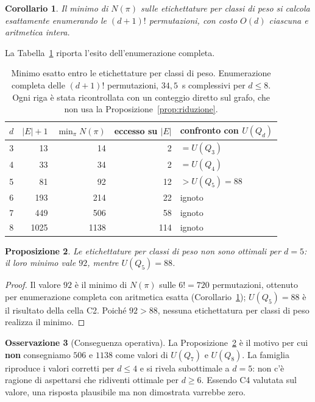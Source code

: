 \documentclass[11pt,a4paper]{article}
\theoremstyle{plain}
\newtheorem{proposition}{Proposizione}
\newtheorem{corollary}[proposition]{Corollario}
\theoremstyle{definition}
\newtheorem{remark}[proposition]{Osservazione}
\newcommand{\Qd}{Q_d}
\begin{document}
\begin{corollary}\label{cor:enumerazione}
Il minimo di $N(\pi)$ sulle etichettature per classi di peso si calcola
esattamente enumerando le $(d+1)!$ permutazioni, con costo $O(d)$ ciascuna e
aritmetica intera.
\end{corollary}

La Tabella~\ref{tab:classi} riporta l'esito dell'enumerazione completa.

\begin{table}[h]
\centering
\begin{tabular}{crrrl}
\toprule
$d$ & $|E|+1$ & $\min_\pi N(\pi)$ & eccesso su $|E|$ & confronto con $U(\Qd)$\\
\midrule
3 & 13   & 14   & 2   & $=U(Q_3)$\\
4 & 33   & 34   & 2   & $=U(Q_4)$\\
5 & 81   & 92   & 12  & $>U(Q_5)=88$\\
6 & 193  & 214  & 22  & ignoto\\
7 & 449  & 506  & 58  & ignoto\\
8 & 1025 & 1138 & 114 & ignoto\\
\bottomrule
\end{tabular}
\caption{Minimo esatto entro le etichettature per classi di peso.
Enumerazione completa delle $(d+1)!$ permutazioni, $34{,}5$~s complessivi per
$d\le8$. Ogni riga è stata ricontrollata con un conteggio diretto sul grafo,
che non usa la Proposizione~\ref{prop:riduzione}.}
\label{tab:classi}
\end{table}

\begin{proposition}\label{prop:nonottimale}
Le etichettature per classi di peso non sono ottimali per $d=5$: il loro minimo
vale $92$, mentre $U(Q_5)=88$.
\end{proposition}

\begin{proof}
Il valore $92$ è il minimo di $N(\pi)$ sulle $6!=720$ permutazioni, ottenuto per
enumerazione completa con aritmetica esatta (Corollario~\ref{cor:enumerazione});
$U(Q_5)=88$ è il risultato della cella C2. Poiché $92>88$, nessuna etichettatura
per classi di peso realizza il minimo.
\end{proof}

\begin{remark}[Conseguenza operativa]
La Proposizione~\ref{prop:nonottimale} è il motivo per cui \textbf{non}
consegniamo $506$ e $1138$ come valori di $U(Q_7)$ e $U(Q_8)$. La famiglia
riproduce i valori corretti per $d\le4$ e si rivela subottimale a $d=5$: non c'è
ragione di aspettarsi che ridiventi ottimale per $d\ge6$. Essendo C4 valutata sul
valore, una risposta plausibile ma non dimostrata varrebbe zero.
\end{remark}
\end{document}
